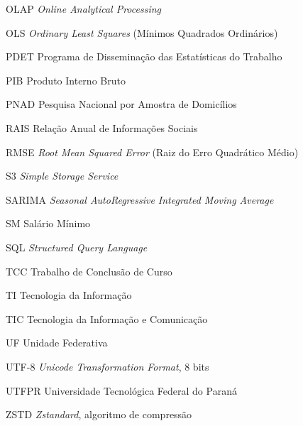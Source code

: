\begin{siglas}
    \item[OLAP] \textit{Online Analytical Processing}
    \item[OLS] \textit{Ordinary Least Squares} (Mínimos Quadrados Ordinários)
    \item[PDET] Programa de Disseminação das Estatísticas do Trabalho
    \item[PIB] Produto Interno Bruto
    \item[PNAD] Pesquisa Nacional por Amostra de Domicílios
    \item[RAIS] Relação Anual de Informações Sociais
    \item[RMSE] \textit{Root Mean Squared Error} (Raiz do Erro Quadrático Médio)
    \item[S3] \textit{Simple Storage Service}
    \item[SARIMA] \textit{Seasonal AutoRegressive Integrated Moving Average}
    \item[SM] Salário Mínimo
    \item[SQL] \textit{Structured Query Language}
    \item[TCC] Trabalho de Conclusão de Curso
    \item[TI] Tecnologia da Informação
    \item[TIC] Tecnologia da Informação e Comunicação
    \item[UF] Unidade Federativa
    \item[UTF-8] \textit{Unicode Transformation Format}, 8 bits
    \item[UTFPR] Universidade Tecnológica Federal do Paraná
    \item[ZSTD] \textit{Zstandard}, algoritmo de compressão
\end{siglas}
